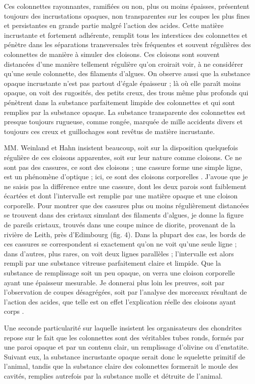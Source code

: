 \documentclass[a4paper, 12pt, oneside, french]{article}
\begin{document}
Ces colonnettes rayonnantes, ramifiées ou non, plus ou moins épaisses, présentent toujours des incrustations opaques, non transparentes sur les coupes les plus fines et persistantes en grande partie malgré l'action des acides. Cette matière incrustante et fortement adhérente, remplit tous les interstices des colonnettes et pénètre dans les séparations transversales très fréquentes et souvent régulières des colonnettes de manière à simuler des cloisons. Ces cloisons sont souvent distancées d'une manière tellement régulière qu'on croirait voir, à ne considérer qu'une seule colonnette, des filaments d'algues. On observe aussi que la substance opaque incrustante n'est pas partout d'égale épaisseur ; là où elle paraît moins opaque, on voit des rugosités, des petits creux, des trous même plus profonds qui pénètrent dans la substance parfaitement limpide des colonnettes et qui sont remplies par la substance opaque. La substance transparente des colonnettes est presque toujours rugueuse, comme rongée, marquée de mille accidents divers et toujours ces creux et guillochages sont revêtus de matière incrustante.

MM. Weinland et Hahn insistent beaucoup, soit sur la disposition quelquefois régulière de ces cloisons apparentes, soit sur leur nature comme cloisons. Ce ne sont pas des cassures, ce sont des cloisons ; une cassure forme une simple ligne, est \og un phénomène d'optique \fg ; ici, ce sont \og des cloisons corporelles \fg. J'avoue que je ne saisis pas la différence entre une cassure, dont les deux parois sont faiblement écartées et dont l'intervalle est remplie par une matière opaque et une cloison corporelle. Pour montrer que des cassures plus ou moins régulièrement distancées se trouvent dans des cristaux simulant des filaments d'algues, je donne la figure de pareils cristaux, trouvés dans une coupe mince de diorite, provenant de la rivière de Leith, près d'Edimbourg (fig. 4). Dans la plupart des cas, les bords de ces cassures se correspondent si exactement qu'on ne voit qu'une seule ligne ; dans d'autres, plus rares, on voit deux lignes parallèles ; l'intervalle est alors rempli par une substance vitreuse parfaitement claire et limpide. Que la substance de remplissage soit un peu opaque, on verra une cloison corporelle ayant une épaisseur mesurable. Je donnerai plus loin les preuves, soit par l'observation de coupes désagrégées, soit par l'analyse des morceaux résultant de l'action des acides, que telle est on effet l'explication réelle des cloisons \og ayant corps \fg.

Une seconde particularité sur laquelle insistent les organisateurs des chondrites repose sur le fait que les colonnettes sont des véritables tubes ronds, formés par une paroi opaque et par un contenu clair, un remplissage d'olivine ou d'enstatite. Suivant eux, la substance incrustante opaque serait donc le squelette primitif de l'animal, tandis que la substance claire des colonnettes formerait le moule des cavités, remplies autrefois par la substance molle et détruite de l'animal.
\end{document}
